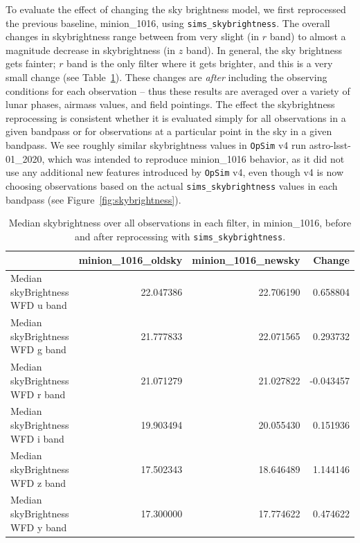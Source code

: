 \documentclass[DM,lsstdraft,authoryear,toc]{lsstdoc}
\newcommand{\opsim}{\texttt{OpSim}\xspace}
\newcommand{\simsky}{\texttt{sims\_skybrightness}\xspace}
\begin{document}
To evaluate the effect of changing the sky brightness model, we first reprocessed the previous baseline, minion\_1016, using \simsky. The overall changes in skybrightness range between from very slight (in $r$ band) to almost a magnitude decrease in skybrightness (in $z$ band). In general, the sky brightness gets fainter; $r$ band is the only filter where it gets brighter, and this is a very small change (see Table~\ref{tab:medskybright}). These changes are {\it after} including the observing conditions for each observation -- thus these results are averaged over a variety of lunar phases, airmass values, and field pointings. The effect the skybrightness reprocessing is consistent whether it is evaluated simply for all observations in a given bandpass or  for observations at a particular point in the sky in a given bandpass. We see roughly similar skybrightness values in \opsim v4 run astro-lsst-01\_2020, which was intended to reproduce minion\_1016 behavior, as it did not use any additional new features introduced by \opsim v4, even though v4 is now choosing observations based on the actual \simsky values in each bandpass (see Figure~\ref{fig:skybrightness}). 

\begin{table}[htp]
\caption{Median skybrightness over all observations in each filter, in minion\_1016, before and after reprocessing with \simsky.}
\begin{center}
\begin{tabular}{lrrr}
{} &  minion\_1016\_oldsky &  minion\_1016\_newsky &    Change \\
\hline
Median skyBrightness WFD u band       &           22.047386 &           22.706190 &  0.658804 \\
Median skyBrightness WFD g band       &           21.777833 &           22.071565 &  0.293732 \\
Median skyBrightness WFD r band       &           21.071279 &           21.027822 & -0.043457 \\
Median skyBrightness WFD i band       &           19.903494 &           20.055430 &  0.151936 \\
Median skyBrightness WFD z band       &           17.502343 &           18.646489 &  1.144146 \\
Median skyBrightness WFD y band       &           17.300000 &           17.774622 &  0.474622 \\
\hline
\end{tabular}
\end{center}
\label{tab:medskybright}
\end{table}
\end{document}
